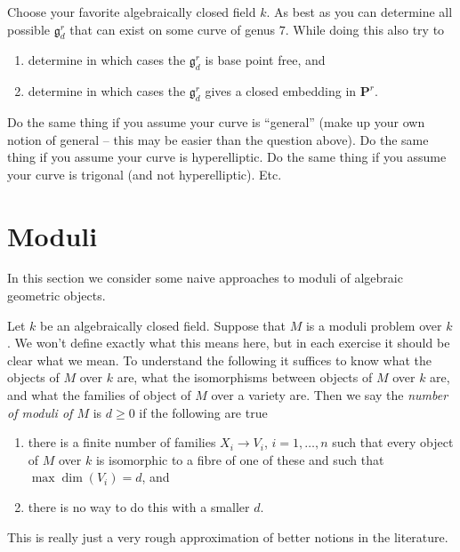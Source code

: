 \begin{exercise}
\label{exercise-genus-7}
Choose your favorite algebraically closed field $k$.
As best as you can determine all possible $\mathfrak g^r_d$
that can exist on some curve of genus $7$.
While doing this also try to
\begin{enumerate}
\item determine in which cases the $\mathfrak g^r_d$ is base point free, and
\item determine in which cases the $\mathfrak g^r_d$ gives a closed
embedding in $\mathbf{P}^r$.
\end{enumerate}
Do the same thing if you assume your curve is ``general'' (make
up your own notion of general -- this may be easier than the question above).
Do the same thing if you assume your curve is hyperelliptic.
Do the same thing if you assume your curve is trigonal
(and not hyperelliptic). Etc.
\end{exercise}





\section{Moduli}
\label{section-moduli}

\noindent
In this section we consider some naive approaches to moduli of
algebraic geometric objects.

\medskip\noindent
Let $k$ be an algebraically closed field. Suppose that $M$ is a
moduli problem over $k$. We won't define exactly what this means
here, but in each exercise it should be clear what we mean.
To understand the following it suffices to know
what the objects of $M$ over $k$ are, what the isomorphisms between
objects of $M$ over $k$ are, and what the families of object of $M$
over a variety are. Then we say the {\it number of moduli of $M$}
is $d \geq 0$ if the following are true
\begin{enumerate}
\item there is a finite number of families $X_i \to V_i$, $i = 1, \ldots, n$
such that every object of $M$ over $k$ is isomorphic to a fibre of one
of these and such that $\max \dim(V_i) = d$, and
\item there is no way to do this with a smaller $d$.
\end{enumerate}
This is really just a very rough approximation of better notions in
the literature.

